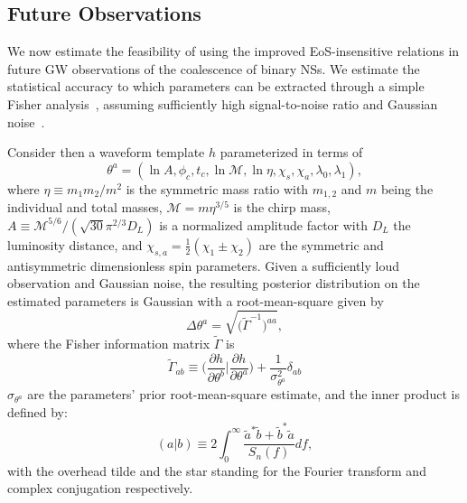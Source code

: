 \documentclass[prd,twocolumn,nofootinbib,superscriptaddress,amsmath,amssymb]{revtex4-1}
\begin{document}
\subsection{Future Observations}\label{sec:futureObservations}

We now estimate the feasibility of using the improved EoS-insensitive relations in future GW observations of the coalescence of binary NSs. We estimate the statistical accuracy to which parameters can be extracted through a simple Fisher analysis~\cite{Finn:Fisher,Cutler:Fisher}, assuming sufficiently high signal-to-noise ratio and Gaussian noise~\cite{Cutler:Fisher,Berti:Fisher,Poisson:Fisher}. 

Consider then a waveform template $h$ parameterized in terms of
\begin{equation}\label{eq:template}
\theta^a=(\ln{A},\phi_c,t_c,\ln{\mathcal{M}},\ln{\mathcal{\eta}},\chi_s,\chi_a,\lambda_0, \lambda_1),
\end{equation}
where $\eta \equiv m_1 m_2/m^2$ is the symmetric mass ratio with $m_{1,2}$ and $m$ being the individual and total masses, $\mathcal{M}=m \eta^{3/5}$ is the chirp mass, $A \equiv {\mathcal{M}^{5/6}}/({\sqrt{30}\pi^{2/3}D_L})$ is a normalized amplitude factor with $D_L$ the luminosity distance, and $\chi_{s,a}=\frac{1}{2}(\chi_1\pm\chi_2)$ are the symmetric and antisymmetric dimensionless spin parameters. Given a sufficiently loud observation and Gaussian noise, the resulting posterior distribution on the estimated parameters is Gaussian with a root-mean-square given by
\begin{equation}
\Delta \theta^a=\sqrt{\Big( \tilde{\Gamma}^{-1}\Big)^{aa}},
\end{equation}
where the Fisher information matrix $\tilde{\Gamma}$ is
\begin{equation}
\tilde{\Gamma}_{ab} \equiv \Big( \frac{\partial h}{\partial \theta^b} \Big| \frac{\partial h}{\partial \theta^a}\Big) + \frac{1}{\sigma_{\theta^a}^2} \delta_{ab}
\end{equation}
$\sigma_{\theta^a}$ are the parameters' prior root-mean-square estimate, and the inner product is defined by:
\begin{equation}
(a|b) \equiv 2 \int^{\infty}_0\frac{\tilde{a}^*\tilde{b}+\tilde{b}^*\tilde{a}}{S_n(f)}df,
\end{equation}
with the overhead tilde and the star standing for the Fourier transform and complex conjugation respectively. 
\end{document}
